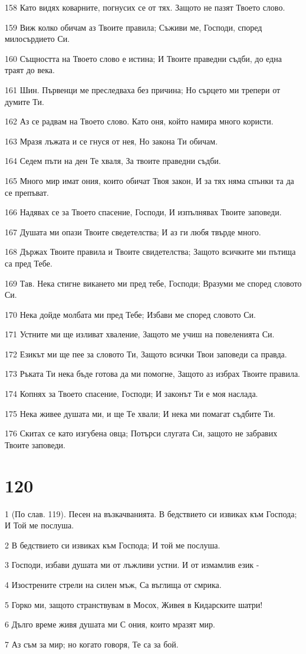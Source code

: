 \par 158 Като видях коварните, погнусих се от тях. Защото не пазят Твоето слово.
\par 159 Виж колко обичам аз Твоите правила; Съживи ме, Господи, според милосърдието Си.
\par 160 Същността на Твоето слово е истина; И Твоите праведни съдби, до една траят до века.
\par 161 Шин. Първенци ме преследваха без причина; Но сърцето ми трепери от думите Ти.
\par 162 Аз се радвам на Твоето слово. Като оня, който намира много користи.
\par 163 Мразя лъжата и се гнуся от нея, Но закона Ти обичам.
\par 164 Седем пъти на ден Те хваля, За твоите праведни съдби.
\par 165 Много мир имат ония, които обичат Твоя закон, И за тях няма спънки та да се препъват.
\par 166 Надявах се за Твоето спасение, Господи, И изпълнявах Твоите заповеди.
\par 167 Душата ми опази Твоите сведетелства; И аз ги любя твърде много.
\par 168 Държах Твоите правила и Твоите свидетелства; Защото всичките ми пътища са пред Тебе.
\par 169 Тав. Нека стигне викането ми пред тебе, Господи; Вразуми ме според словото Си.
\par 170 Нека дойде молбата ми пред Тебе; Избави ме според словото Си.
\par 171 Устните ми ще изливат хваление, Защото ме учиш на повеленията Си.
\par 172 Езикът ми ще пее за словото Ти, Защото всички Твои заповеди са правда.
\par 173 Ръката Ти нека бъде готова да ми помогне, Защото аз избрах Твоите правила.
\par 174 Копнях за Твоето спасение, Господи; И законът Ти е моя наслада.
\par 175 Нека живее душата ми, и ще Те хвали; И нека ми помагат съдбите Ти.
\par 176 Скитах се като изгубена овца; Потърси слугата Си, защото не забравих Твоите заповеди.

\chapter{120}

\par 1 (По слав. 119). Песен на възкачванията. В бедствието си извиках към Господа; И Той ме послуша.
\par 2 В бедствието си извиках към Господа; И той ме послуша.
\par 3 Господи, избави душата ми от лъжливи устни. И от измамлив език -
\par 4 Изострените стрели на силен мъж, Са въглища от смрика.
\par 5 Горко ми, защото странствувам в Мосох, Живея в Кидарските шатри!
\par 6 Дълго време живя душата ми С ония, които мразят мир.
\par 7 Аз съм за мир; но когато говоря, Те са за бой.

